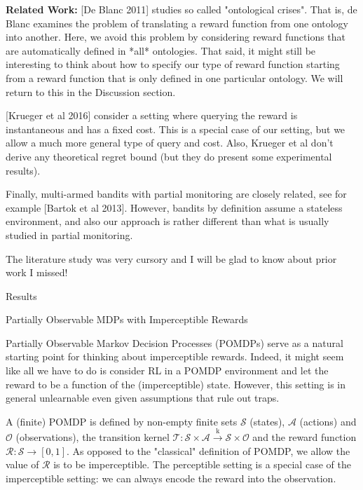 \documentclass[a4paper]{article}
\newcommand{\Co}[1]{}
\newcommand{\San}[1]{}
\newcommand{\K}{\xrightarrow{\mathrm{k}}}
\newcommand{\St}{\mathcal{S}}
\newcommand{\A}{\mathcal{A}}
\newcommand{\Ob}{\mathcal{O}}
\newcommand{\R}{\mathcal{R}}
\newcommand{\T}{\mathcal{T}}
\begin{document}
\textbf{Related Work:}\Co{b} [De Blanc 2011]\San{(https://arxiv.org/abs/1105.3821)}\Co{s} studies so called "ontological crises". That is, de Blanc examines the problem of translating a reward function from one ontology into another. Here, we avoid this problem by considering reward functions that are automatically defined in *all* ontologies. That said, it might still be interesting to think about how to specify our type of reward function starting from a reward function that is only defined in one particular ontology. We will return to this in the Discussion section.

[Krueger et al 2016]\San{(https://pdfs.semanticscholar.org/a47f/52b25ce1e56a03876d9c0fd7c45e63270eb4.pdf)}\Co{s} consider a setting where querying the reward is instantaneous and has a fixed cost. This is a special case of our setting, but we allow a much more general type of query and cost. Also, Krueger et al don't derive any theoretical regret bound (but they do present some experimental results).

Finally, multi-armed bandits with partial monitoring are closely related, see for example [Bartok et al 2013]\San{(http://www.mit.edu/~rakhlin/papers/partial_monitoring.pdf)}\Co{s}. However, bandits by definition assume a stateless environment, and also our approach is rather different than what is usually studied in partial monitoring.

The literature study was very cursory and I will be glad to know about prior work I missed!

\begin{Huge}Results\end{Huge}

\begin{Large}Partially Observable MDPs with Imperceptible Rewards\end{Large}

Partially Observable Markov Decision Processes (POMDPs) serve as a natural starting point for thinking about imperceptible rewards. Indeed, it might seem like all we have to do is consider RL in a POMDP environment and let the reward to be a function of the (imperceptible) state. However, this setting is in general unlearnable even given assumptions that rule out traps.

A (finite) POMDP is defined by non-empty finite sets $\St$ (states), $\A$ (actions) and $\Ob$ (observations), the transition kernel $\T:\St\times\A\K\St\times\Ob$ and the reward function $\R:\St\rightarrow[0,1]$. As opposed to the "classical" definition of POMDP, we allow the value of $\R$ is to be imperceptible. The perceptible setting is a special case of the imperceptible setting: we can always encode the reward into the observation.
\end{document}
